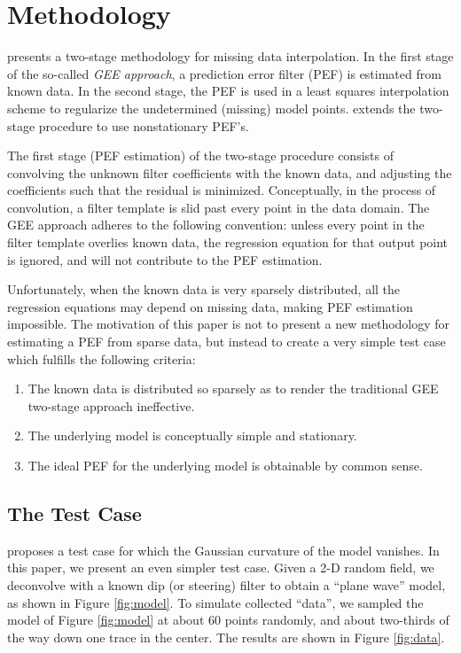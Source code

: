\section{ Methodology}

\cite{gee} presents a two-stage methodology for missing data interpolation.
In the first stage of the so-called {\em GEE approach}, a prediction error filter (PEF) 
is estimated from known data.
In the second stage, the PEF is used in a least squares interpolation scheme to 
regularize the undetermined (missing) model points.  \cite{Crawley.sep.104}
extends the two-stage procedure to use nonstationary PEF's.
\par
The first stage (PEF estimation) of the two-stage procedure consists of convolving
the unknown filter coefficients with the known data, and adjusting the coefficients
such that the residual is minimized.  Conceptually, in the process of convolution,
a filter template is slid past every point in the data domain.  The GEE approach adheres to the
following convention: unless every point in the filter template overlies known data, the 
regression equation for that output point is ignored, and will not contribute to 
the PEF estimation.
\par
Unfortunately, when the known data is very sparsely distributed, all the regression
equations may depend on missing data, making PEF estimation impossible.  
The motivation of this paper is not to present a new methodology for estimating a PEF 
from sparse data, but instead to create a very simple test case which fulfills the
following criteria:
\begin{enumerate}
	\item  The known data is distributed so sparsely as to render the traditional 
	       GEE two-stage approach ineffective.
	\item  The underlying model is conceptually simple and stationary.
	\item  The ideal PEF for the underlying model is obtainable by common sense.
\end{enumerate}

\subsection{The Test Case}

\cite{Claerbout.sep.103.jon5} proposes a test case for which the Gaussian curvature
of the model vanishes.  In this paper, we present an even simpler test case.  Given a 
2-D random field, we deconvolve with a known dip (or steering) \cite[]{Clapp.sep.95.bob1} 
filter to obtain a ``plane wave'' model, as shown in Figure \ref{fig:model}.
To simulate collected ``data'', we sampled the model of Figure \ref{fig:model} at
about 60 points randomly, and about two-thirds of the way down one trace in the center.  
The results are shown in Figure \ref{fig:data}.

